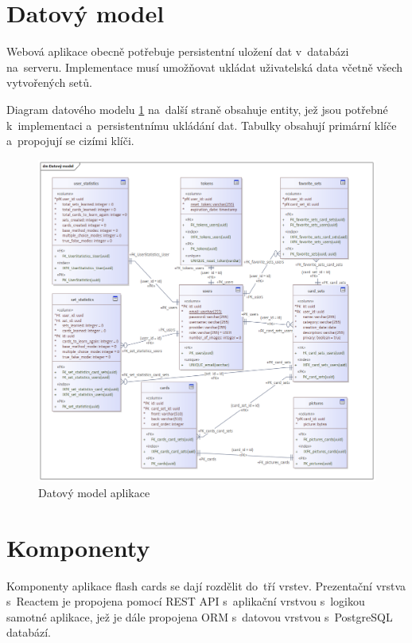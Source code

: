 \documentclass[twoside]{ctuthesis}
\begin{document}
\section{Datový model}
\label{sec:fiveone}

Webová aplikace obecně potřebuje persistentní uložení dat v~databázi na~serveru. Implementace musí umožňovat ukládat uživatelská data včetně všech vytvořených setů.

Diagram datového modelu \ref{fig:dm} na~další straně obsahuje entity, jež jsou potřebné k~implementaci a~persistentnímu ukládání dat. Tabulky obsahují primární klíče a~propojují se cizími klíči.

\newpage

\begin{figure}[H]
\includegraphics[width=1.4\textwidth, height=0.98\textheight, center]{Datový model.png}
\caption{Datový model aplikace}
\label{fig:dm}
\end{figure}

\section{Komponenty}
\label{sec:fivetwo}

Komponenty aplikace flash cards se dají rozdělit do~tří vrstev. Prezentační vrstva s~Reactem je propojena pomocí REST API s~aplikační vrstvou s~logikou samotné aplikace, jež je dále propojena ORM s~datovou vrstvou s~PostgreSQL databází.
\end{document}
